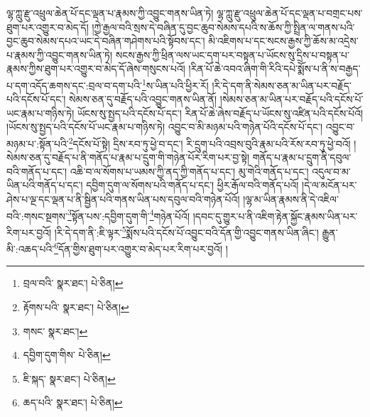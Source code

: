 ལྷ་ཀླུ་རྫུ་འཕྲུལ་ཆེན་པོ་དང་ལྡན་པ་རྣམས་ཀྱི་འབྱུང་གནས་ཡིན་ཏེ། ལྷ་ཀླུ་རྫུ་འཕྲུལ་ཆེན་པོ་དང་ལྡན་པ་བགྲང་པས་ཐུག་པར་འགྱུར་བ་མེད་དོ། །ཀྱེ་རྒྱལ་བའི་སྲས་དེ་བཞིན་དུ་བྱང་ཆུབ་སེམས་དཔའི་ས་ཆོས་ཀྱི་སྤྲིན་ལ་གནས་པའི་བྱང་ཆུབ་སེམས་དཔའ་ཡང་དེ་བཞིན་གཤེགས་པའི་སྟོབས་དང་། མི་འཇིགས་པ་དང་སངས་རྒྱས་ཀྱི་ཆོས་མ་འདྲེས་པ་རྣམས་ཀྱི་འབྱུང་གནས་ཡིན་ཏེ། སངས་རྒྱས་ཀྱི་ཕྲིན་ལས་ཡང་དག་པར་བསྟན་པ་ཡོངས་སུ་དྲིས་པ་བསྟན་པ་རྣམས་ཀྱིས་ཐུག་པར་འགྱུར་བ་མེད་དོ་ཞེས་གསུངས་པའོ། །རིན་པོ་ཆེ་འབའ་ཞིག་གི་རིའི་དཔེ་སྨོས་པ་ནི་ས་བརྒྱད་པ་དག་འདོད་ཆགས་དང་:བྲལ་བ་དག་པའི་\footnote{བྲལ་བའི་  སྣར་ཐང་།  པེ་ཅིན། }ས་ཡིན་པའི་ཕྱིར་རོ། །རི་དེ་དག་ནི་སེམས་ཅན་མ་ཡིན་པར་བརྗོད་པའི་དངོས་པོ་དང་། སེམས་ཅན་དུ་བརྗོད་པའི་འབྱུང་གནས་ཡིན་ནོ། །སེམས་ཅན་མ་ཡིན་པར་བརྗོད་པའི་དངོས་པོ་ཡང་རྣམ་པ་གཉིས་ཏེ། ཡོངས་སུ་སྤྱད་པའི་དངོས་པོ་དང་། རིན་པོ་ཆེ་ཞེས་བརྗོད་པ་ཡོངས་སུ་འཛིན་པའི་དངོས་པོའོ། །ཡོངས་སུ་སྤྱད་པའི་དངོས་པོ་ཡང་རྣམ་པ་གཉིས་ཏེ། འབྱུང་བ་མི་མཉམ་པའི་གཉེན་པོའི་དངོས་པོ་དང་། འབྱུང་བ་མཉམ་པ་:སྟོན་པའི་\footnote{རྟོགས་པའི་  སྣར་ཐང་།  པེ་ཅིན། }དངོས་པོ་སྟེ། དྲིས་རབ་ཏུ་ཕྱེ་བ་དང་། རི་དྲུག་པའི་འབྲས་བུའི་རྣམ་པའི་རོས་རབ་ཏུ་ཕྱེ་བའོ། །སེམས་ཅན་དུ་བརྗོད་པ་ནི་གནོད་པ་རྣམ་པ་དྲུག་གི་གཉེན་པོར་རིག་པར་བྱ་སྟེ། གནོད་པ་རྣམ་པ་དྲུག་ནི་དབུལ་བའི་གནོད་པ་དང་། འཆི་བ་ལ་སོགས་པ་ཡམས་ཀྱི་ནད་ཀྱི་གནོད་པ་དང་། མུ་གེའི་གནོད་པ་དང་། འདུལ་བ་མ་ཡིན་པའི་གནོད་པ་དང་། དབྱིག་དུག་ལ་སོགས་པའི་གནོད་པ་དང་། ཕྱིར་རྒོལ་བའི་གནོད་པའོ། །དེ་ལ་མངོན་པར་ཤེས་པ་ལྔ་དང་ལྡན་པ་ནི་སྦྱིན་པའི་གནས་ཡིན་པས་དབུལ་བའི་གཉེན་པོའོ། །ལྷ་མ་ཡིན་རྣམས་ནི་དེ་འཇིལ་བའི་:གསང་སྔགས་\footnote{གསང་  སྣར་ཐང་། }སྟོན་པས་:དབྱིག་དུག་གི་\footnote{དབྱིག་དུག་གིས་  པེ་ཅིན། }གཉེན་པོའོ། །དབང་དུ་གྱུར་པ་ནི་འཇིག་རྟེན་སྐྱོང་རྣམས་ཡིན་པར་རིག་པར་བྱའོ། །རི་དེ་དག་ནི་:ཇི་ལྟར་\footnote{ཇི་སྐད་  སྣར་ཐང་།  པེ་ཅིན། }སྨོས་པའི་དངོས་པོ་འབྱུང་བའི་དོན་གྱི་འབྱུང་གནས་ཡིན་ཞིང་། རྒྱུན་མི་:འཆད་པའི་\footnote{ཆད་པའི་  སྣར་ཐང་།  པེ་ཅིན། }དོན་གྱིས་ཐུག་པར་འགྱུར་བ་མེད་པར་རིག་པར་བྱའོ། །

